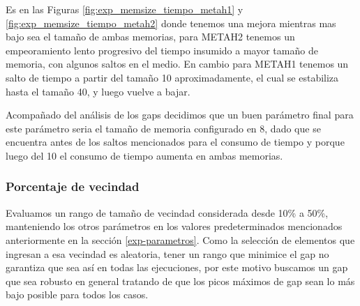 \documentclass[10pt,a4paper]{article}
\begin{document}
Es en las Figuras \ref{fig:exp_memsize_tiempo_metah1} y \ref{fig:exp_memsize_tiempo_metah2} donde tenemos una mejora mientras mas bajo sea el tamaño de ambas memorias, para METAH2 tenemos un empeoramiento lento progresivo del tiempo insumido a mayor tamaño de memoria, con algunos saltos en el medio. En cambio para METAH1 tenemos un salto de tiempo a partir del tamaño 10 aproximadamente, el cual se estabiliza hasta el tamaño 40, y luego vuelve a bajar.

Acompañado del análisis de los gaps decidimos que un buen parámetro final para este parámetro seria el tamaño de memoria configurado en 8, dado que se encuentra antes de los saltos mencionados para el consumo de tiempo y porque luego del 10 el consumo de tiempo aumenta en ambas memorias.



\subsubsection{Porcentaje de vecindad}
Evaluamos un rango de tamaño de vecindad considerada desde 10\% a 50\%, manteniendo los otros parámetros en los valores predeterminados mencionados anteriormente en la sección \ref{exp-parametros}. Como la selección de elementos que ingresan a esa vecindad es aleatoria, tener un rango que minimice el gap no garantiza que sea así en todas las ejecuciones, por este motivo buscamos un gap que sea robusto en general tratando de que los picos máximos de gap sean lo más bajo posible para todos los casos.
\end{document}
